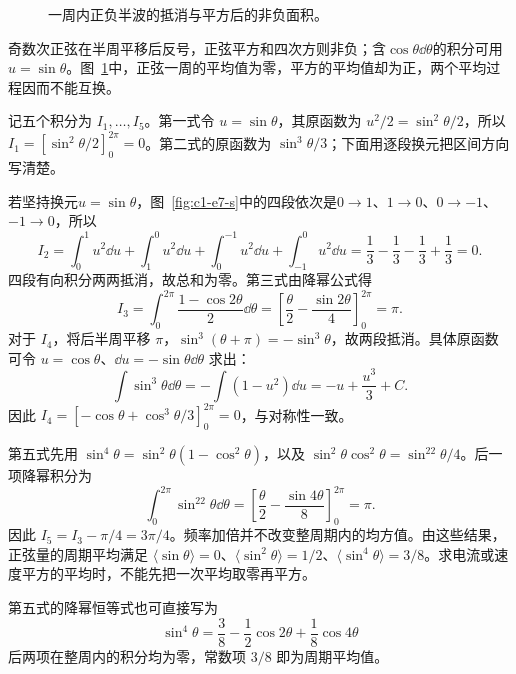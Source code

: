 \begin{figure}[H]\centering
{}
\caption{一周内正负半波的抵消与平方后的非负面积。}\label{fig:c1-e7-q}
\end{figure}
\begin{solution}
奇数次正弦在半周平移后反号，正弦平方和四次方则非负；含$\cos\theta\dd\theta$的积分可用$u=\sin\theta$。图~\ref{fig:c1-e7-q}中，正弦一周的平均值为零，平方的平均值却为正，两个平均过程因而不能互换。


记五个积分为 $I_1,\ldots,I_5$。第一式令 $u=\sin\theta$，其原函数为 $u^2/2=\sin^2\theta/2$，所以 $I_1=[\sin^2\theta/2]_0^{2\pi}=0$。第二式的原函数为 $\sin^3\theta/3$；下面用逐段换元把区间方向写清楚。

若坚持换元$u=\sin\theta$，图~\ref{fig:c1-e7-s}中的四段依次是$0\to1$、$1\to0$、$0\to-1$、$-1\to0$，所以
\[I_2=\int_0^1u^2\dd u+\int_1^0u^2\dd u+
\int_0^{-1}u^2\dd u+\int_{-1}^0u^2\dd u
=\frac13-\frac13-\frac13+\frac13=0.
\]
四段有向积分两两抵消，故总和为零。第三式由降幂公式得
\[I_3=\int_0^{2\pi}\frac{1-\cos2\theta}{2}\dd\theta
=\left[\frac\theta2-\frac{\sin2\theta}{4}\right]_0^{2\pi}=\pi.
\]
对于 $I_4$，将后半周平移 $\pi$，$\sin^3(\theta+\pi)=-\sin^3\theta$，故两段抵消。具体原函数可令 $u=\cos\theta$、$\dd u=-\sin\theta\dd\theta$ 求出：
\[
\int\sin^3\theta\dd\theta=-\int(1-u^2)\dd u=-u+\frac{u^3}{3}+C.
\]
因此 $I_4=[-\cos\theta+\cos^3\theta/3]_0^{2\pi}=0$，与对称性一致。

第五式先用 $\sin^4\theta=\sin^2\theta(1-\cos^2\theta)$，以及 $\sin^2\theta\cos^2\theta=\sin^22\theta/4$。后一项降幂积分为
\[
\int_0^{2\pi}\sin^22\theta\dd\theta
=\left[\frac\theta2-\frac{\sin4\theta}{8}\right]_0^{2\pi}=\pi.
\]
因此 $I_5=I_3-\pi/4=\boxed{3\pi/4}$。频率加倍并不改变整周期内的均方值。由这些结果，正弦量的周期平均满足 $\langle\sin\theta\rangle=0$、$\langle\sin^2\theta\rangle=1/2$、$\langle\sin^4\theta\rangle=3/8$。求电流或速度平方的平均时，不能先把一次平均取零再平方。


第五式的降幂恒等式也可直接写为
\[\sin^4\theta=\frac38-\frac12\cos2\theta+\frac18\cos4\theta\]
后两项在整周内的积分均为零，常数项 $3/8$ 即为周期平均值。


\end{solution}
